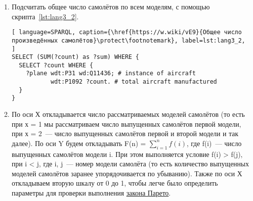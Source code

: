 \begin{enumerate} 
  \item Подсчитать общее число самолётов по всем моделям, с помощью скрипта~\ref{lst:lang3_2}.
  
  
\begin{lstlisting}[ language=SPARQL, caption={\href{https://w.wiki/vE9}{Общее число произведённых самолётов}\protect\footnotemark}, label=lst:lang3_2, ]
SELECT (SUM(?count) as ?sum) WHERE {
  SELECT ?count WHERE {
    ?plane wdt:P31 wd:Q11436; # instance of aircraft
		   wdt:P1092 ?count. # total aircraft manufactured
  }
}
\end{lstlisting}
  
  
  \item По оси Х откладывается число рассматриваемых моделей самолётов (то есть при х = 1 мы рассматриваем число выпущенных самолётов первой модели, при х = 2~--- число выпущенных самолётов первой и второй модели и так далее). По оси Y будем откладывать F(n) = $\sum\limits_{i=1}^n f(i)$, где f(i)~--- число выпущенных самолётов модели i. При этом выполняется условие f(i) > f(j), при i < j, где i, j~--- номер модели самолёта (то есть количество выпущенных моделей самолётов заранее упорядочивается по убыванию). Также по оси Х откладываем вторую шкалу от 0 до 1, чтобы легче было определить параметры для проверки выполнения \href{https://w.wiki/vDs}{закона Парето}.
\end{enumerate}

\begin{figure*}[h]

    \setlength{\fboxsep}{0pt}%
    \setlength{\fboxrule}{1pt}%

	\caption{Процентное соотношение количества выпущенных моделей самолётов по n моделям к общему числу выпущенных самолётов за всё время, 2020.}%
    \label{fig:Pareto_principle_diargam}%
\end{figure*}

